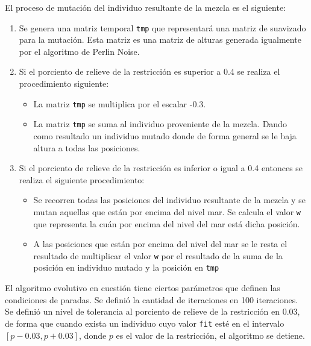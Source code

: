 El proceso de mutación del individuo resultante de la mezcla es el siguiente:

\begin{enumerate}
	\item Se genera una matriz temporal \verb|tmp| que representará una matriz de suavizado para la mutación. Esta matriz es una matriz de alturas generada igualmente por el algoritmo de Perlin Noise.
	\item Si el porciento de relieve de la restricción es superior a 0.4 se realiza el procedimiento siguiente:
	\begin{itemize}
		\item La matriz \verb|tmp| se multiplica por el escalar -0.3.
		\item La matriz \verb|tmp| se suma al individuo proveniente de la mezcla. Dando como resultado un individuo mutado donde de forma general se le baja altura a todas las posiciones.  
	\end{itemize}
	\item Si el porciento de relieve de la restricción es inferior o igual a 0.4 entonces se realiza el siguiente procedimiento: 
	\begin{itemize}
		\item Se recorren todas las posiciones del individuo resultante de la mezcla y se mutan aquellas que están por encima del nivel mar. Se calcula el valor \verb|w| que representa la cuán por encima del nivel del mar está dicha posición.
		\item A las posiciones que están por encima del nivel del mar se le resta el resultado de multiplicar el valor \verb|w| por el resultado de la suma de la posición en individuo mutado y  la posición en \verb|tmp|
	\end{itemize}
\end{enumerate}

El algoritmo evolutivo en cuestión tiene ciertos parámetros que definen las condiciones de paradas. Se definió la cantidad de iteraciones en 100 iteraciones. Se definió un nivel de tolerancia al porciento de relieve de la restricción en 0.03, de forma que cuando exista un individuo cuyo valor \verb|fit| esté en el intervalo $[p - 0.03, p + 0.03]$, donde $p$ es el valor de la restricción, el algoritmo se detiene.

